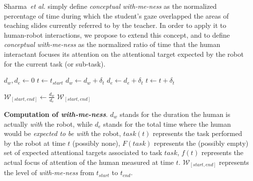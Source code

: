 \documentclass{sig-alternate}
\newcommand{\etal}{\textit{et al.}\xspace}
\begin{document}
Sharma~\etal simply define \emph{conceptual with-me-ness} as the normalized
percentage of time during which the student's gaze overlapped the areas of
teaching slides currently referred to by the teacher.
In order to apply it to human-robot interactions, we propose to extend this
concept, and to define \emph{conceptual with-me-ness} as the normalized
ratio of time that the human interactant focuses its attention on the
attentional target expected by the robot for the current task (or sub-task).


\begin{algorithm}[h!]
    \centering

    \begin{algorithmic}[1]
     {}
    \State $d_w, d_e \gets 0$
    \State $t \gets t_{start}$
    \Repeat
     \label{algline:skiplosttrack}
            \State $d_w \gets d_w + \delta_t$
        \EndIf
        \State $d_e \gets d_e + \delta_t$
    \EndIf
    \State $t \gets t + \delta_t$

    \State $\mathcal{W}_{[start, end]} \gets \frac{d_w}{d_e}$
    \State \Return $\mathcal{W}_{[start, end]}$
    \EndProcedure

    \end{algorithmic}

    \caption{\textbf{Computation of \emph{with-me-ness}}. $d_w$ stands for the duration
        the human is actually \emph{with} the robot, while $d_e$ stands for the
        total time where the human would be \emph{expected to be with} the robot, $task(t)$
        represents the task performed by the robot at time $t$ (possibly none),
        $F(task)$ represents the (possibly empty) set of expected attentional
        targets associated to task $task$, $f(t)$ represents the actual focus of
        attention of the human measured at time $t$. $\mathcal{W}_{[start, end]}$ represents
        the level of \emph{with-me-ness} from $t_{start}$ to $t_{end}$.}
    \label{alg:with-me-ness}
\end{algorithm}
\end{document}
